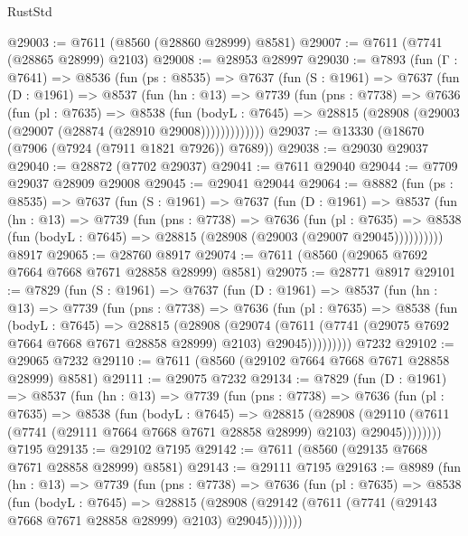 \begin{lexlean}{RustStd}
\begin{coremodule}
{\begin{coremodule}
{{{{{{{{{{{{{{{{{{{{{{{{{{{{{{{{{{@29003 := @7611 (@8560 (@28860 @28999) @8581)
@29007 := @7611 (@7741 (@28865 @28999) @2103)
@29008 := @28953 @28997
@29030 := @7893
    (fun (Γ : @7641) =>
    @8536
      (fun (ps : @8535) =>
      @7637
        (fun (S : @1961) =>
        @7637
          (fun (D : @1961) =>
          @8537
            (fun (hn : @13) =>
            @7739
              (fun (pns : @7738) =>
              @7636
                (fun (pl : @7635) =>
                @8538
                  (fun (bodyL : @7645) =>
                  @28815 (@28908 (@29003 (@29007 (@28874 (@28910 @29008)))))))))))))
@29037 := @13330 (@18670 (@7906 (@7924 (@7911 @1821 @7926)) @7689))
@29038 := @29030 @29037
@29040 := @28872 (@7702 @29037)
@29041 := @7611 @29040
@29044 := @7709 @29037 @28909 @29008
@29045 := @29041 @29044
@29064 := @8882
    (fun (ps : @8535) =>
    @7637
      (fun (S : @1961) =>
      @7637
        (fun (D : @1961) =>
        @8537
          (fun (hn : @13) =>
          @7739
            (fun (pns : @7738) =>
            @7636
              (fun (pl : @7635) =>
              @8538 (fun (bodyL : @7645) => @28815 (@28908 (@29003 (@29007 @29045))))))))))
    @8917
@29065 := @28760 @8917
@29074 := @7611 (@8560 (@29065 @7692 @7664 @7668 @7671 @28858 @28999) @8581)
@29075 := @28771 @8917
@29101 := @7829
    (fun (S : @1961) =>
    @7637
      (fun (D : @1961) =>
      @8537
        (fun (hn : @13) =>
        @7739
          (fun (pns : @7738) =>
          @7636
            (fun (pl : @7635) =>
            @8538
              (fun (bodyL : @7645) =>
              @28815
                (@28908
                  (@29074
                    (@7611
                      (@7741 (@29075 @7692 @7664 @7668 @7671 @28858 @28999) @2103)
                      @29045)))))))))
    @7232
@29102 := @29065 @7232
@29110 := @7611 (@8560 (@29102 @7664 @7668 @7671 @28858 @28999) @8581)
@29111 := @29075 @7232
@29134 := @7829
    (fun (D : @1961) =>
    @8537
      (fun (hn : @13) =>
      @7739
        (fun (pns : @7738) =>
        @7636
          (fun (pl : @7635) =>
          @8538
            (fun (bodyL : @7645) =>
            @28815
              (@28908
                (@29110 (@7611 (@7741 (@29111 @7664 @7668 @7671 @28858 @28999) @2103) @29045))))))))
    @7195
@29135 := @29102 @7195
@29142 := @7611 (@8560 (@29135 @7668 @7671 @28858 @28999) @8581)
@29143 := @29111 @7195
@29163 := @8989
    (fun (hn : @13) =>
    @7739
      (fun (pns : @7738) =>
      @7636
        (fun (pl : @7635) =>
        @8538
          (fun (bodyL : @7645) =>
          @28815
            (@28908 (@29142 (@7611 (@7741 (@29143 @7668 @7671 @28858 @28999) @2103) @29045)))))))
}}}}}}}}}}}}}}}}}}}}}}}}}}}}}}}}}}
\end{coremodule}}
\end{coremodule}
\end{lexlean}
